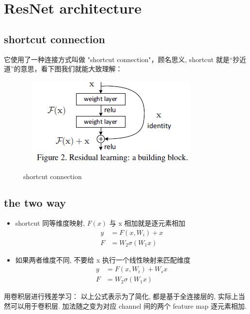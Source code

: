 \documentclass[12pt]{ctexart}%
\begin{document}
	\section{\quad ResNet architecture}
		\subsection{\quad shortcut connection}
			它使用了一种连接方式叫做 "shortcut connection"，顾名思义, shortcut 就是“抄近道”的意思，看下图我们就能大致理解：
				\begin{figure}[H]
					\vspace{-0.2cm}  %
					\setlength{\abovecaptionskip}{-0.2cm}   %
					\centering
					\includegraphics[scale=1]{network_architecture.png}
					\renewcommand{\figurename}{Fig} %
					\caption{shortcut connection}
					\label{fig3:shortcut connection}
				\end{figure}
		
		\subsection{\quad the two way}
			\begin{itemize}
				\item shortcut 同等维度映射, $F(x)$  与 x 相加就是逐元素相加
					\begin{align}
						y &= F(x, W_i) + x \\
						F &= W_2 \sigma(W_1 x)
					\end{align}
					
				\item 如果两者维度不同, 不要给 x 执行一个线性映射来匹配维度
					\begin{align}
						y &= F(x, W_i) + W_s x\\
						F &= W_2 \sigma(W_1 x)
					\end{align}
			\end{itemize}
			用卷积层进行残差学习： 以上公式表示为了简化, 都是基于全连接层的, 实际上当然可以用于卷积层. 加法随之变为对应 channel 间的两个 feature map 逐元素相加.
			
\end{document}
